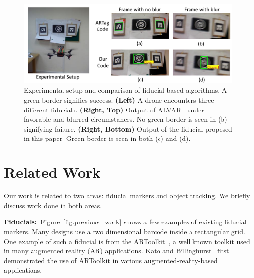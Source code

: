 \documentclass[10pt,twocolumn,letterpaper]{article}
\begin{document}
\begin{figure}[t!]
  \includegraphics[width=\linewidth]{images/teaser}
  \caption{Experimental setup and comparison of fiducial-based
    algorithms. A green border signifies success. 
    \textbf{(Left)} A drone encounters three different fiducials. 
    \textbf{(Right, Top)} Output of ALVAR~\cite{alvar} under favorable and blurred
    circumstances. No green border is seen in (b) signifying failure.
    \textbf{(Right, Bottom)} Output of the fiducial proposed in this paper. Green
    border is seen in both (c) and (d).
    \label{fig:teaser}}
  \end{figure}

\section{Related Work}

Our work is related to two areas: fiducial markers and object tracking. We
briefly discuss work done in both areas.

\textbf{Fiducials:}~Figure~\ref{fig:previous_work} shows a few
examples of existing fiducial markers.  Many designs use a two
dimensional barcode inside a rectangular grid. One example of such a
fiducial is from the ARToolkit~\cite{ARToolkit02}, a well known
toolkit used in many augmented reality (AR) applications. Kato and
Billinghurst~\cite{kato-artoolkit} first demonstrated the use of
ARToolkit in various augmented-reality-based applications.
\end{document}
